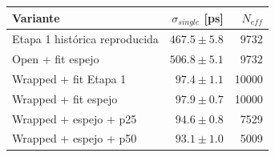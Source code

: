 \begin{tabular}{lrr}\toprule
Variante & $\sigma_{single}$ [ps] & $N_{eff}$\\\midrule
Etapa 1 histórica reproducida & $467.5\pm5.8$ & 9732\\
Open + fit espejo & $506.8\pm5.1$ & 9732\\
Wrapped + fit Etapa 1 & $97.4\pm1.1$ & 10000\\
Wrapped + fit espejo & $97.9\pm0.7$ & 10000\\
Wrapped + espejo + p25 & $94.6\pm0.8$ & 7529\\
Wrapped + espejo + p50 & $93.1\pm1.0$ & 5009\\
\bottomrule\end{tabular}
